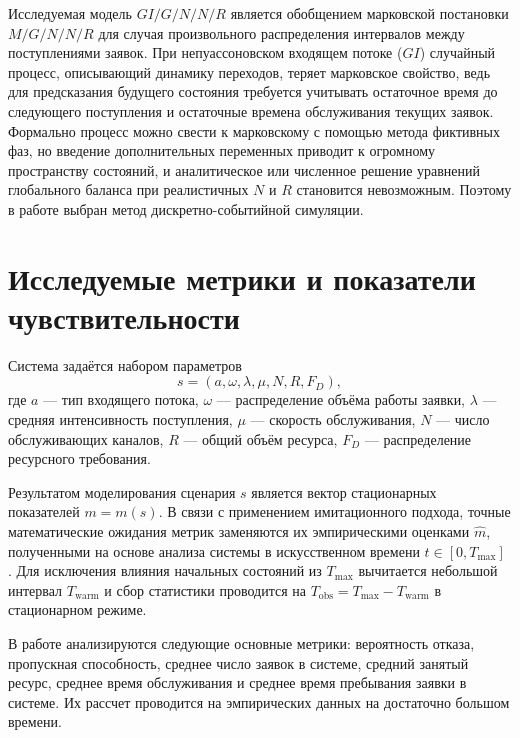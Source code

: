 Исследуемая модель $GI/G/N/N/R$ является обобщением марковской постановки $M/G/N/N/R$ для случая произвольного распределения интервалов между поступлениями заявок\cite{sevastyanov1957_ergodic_refusals,sopin2018_insensitivity}. При непуассоновском входящем потоке ($GI$) случайный процесс, описывающий динамику переходов, теряет марковское свойство, ведь для предсказания будущего состояния требуется учитывать остаточное время до следующего поступления и остаточные времена обслуживания текущих заявок. Формально процесс можно свести к марковскому с помощью метода фиктивных фаз\cite{vishnevskii_dudin_correlated_arrivals_2017,dudin2025_random_environment}, но введение дополнительных переменных приводит к огромному пространству состояний, и аналитическое или численное решение уравнений глобального баланса при реалистичных $N$ и $R$ становится невозможным. Поэтому в работе выбран метод дискретно-событийной симуляции\cite{banks2010_discrete_event_simulation,law2015_simulation_modeling}. 

\section{Исследуемые метрики и показатели чувствительности}
\label{sec:metrics}

Система задаётся набором параметров
$$
s = (a,\omega,\lambda,\mu,N,R,F_D),
$$
где $a$ --- тип входящего потока, $\omega$ --- распределение объёма работы заявки, $\lambda$ --- средняя интенсивность поступления, $\mu$ --- скорость обслуживания, $N$ --- число обслуживающих каналов, $R$ --- общий объём ресурса, $F_D$ --- распределение ресурсного требования.

Результатом моделирования сценария $s$ является вектор стационарных показателей $m = m(s)$. В связи с применением имитационного подхода, точные математические ожидания метрик заменяются их эмпирическими оценками $\widehat{m}$, полученными на основе анализа системы в искусственном времени $t \in [0, T_{\max}]$ \cite{law2015_simulation_modeling,fishman1996_monte_carlo}. Для исключения влияния начальных состояний из $T_{\max}$ вычитается небольшой интервал $T_{\text{warm}}$ и сбор статистики проводится на $T_{\text{obs}} = T_{\max} - T_{\text{warm}}$ в стационарном режиме. 

В работе анализируются следующие основные метрики: вероятность отказа, пропускная способность, среднее число заявок в системе, средний занятый ресурс, среднее время обслуживания и среднее время пребывания заявки в системе\cite{banks2010_discrete_event_simulation,law2015_simulation_modeling}. Их рассчет проводится на эмпирических данных на достаточно большом времени. 

